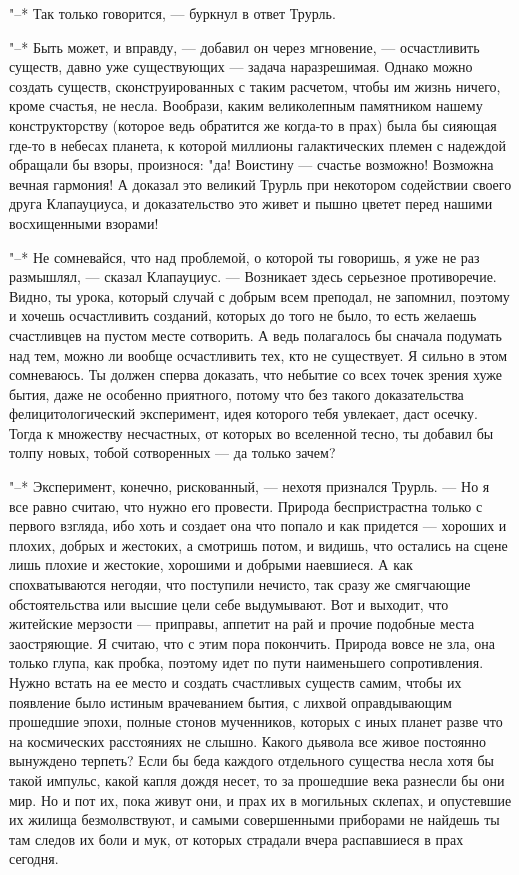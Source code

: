 "--* Так только говорится, --- буркнул в ответ Трурль.

"--* Быть может, и вправду, --- добавил он через мгновение, --- осчастливить
существ, давно уже существующих --- задача
наразрешимая. Однако можно создать существ,
сконструированных с таким расчетом, чтобы им жизнь ничего,
кроме счастья, не несла. Вообрази, каким великолепным
памятником нашему конструкторству (которое ведь обратится же
когда-то в прах) была бы сияющая где-то в небесах планета, к
которой миллионы галактических племен с надеждой обращали бы
взоры, произнося: "да! Воистину --- счастье возможно! Возможна
вечная гармония! А доказал это великий Трурль при некотором
содействии своего друга Клапауциуса, и доказательство это
живет и пышно цветет перед нашими восхищенными взорами!

"--* Не сомневайся, что над проблемой, о которой ты
говоришь, я уже не раз размышлял, --- сказал Клапауциус. --- Возникает
здесь серьезное противоречие. Видно, ты урока,
который случай с добрым всем преподал, не запомнил, поэтому
и хочешь осчастливить созданий, которых до того не было, то
есть желаешь счастливцев на пустом месте сотворить. А ведь
полагалось бы сначала подумать над тем, можно ли вообще
осчастливить тех, кто не существует. Я сильно в этом
сомневаюсь. Ты должен сперва доказать, что небытие со всех
точек зрения хуже бытия, даже не особенно приятного, потому
что без такого доказательства фелицитологический
эксперимент, идея которого тебя увлекает, даст осечку. Тогда
к множеству несчастных, от которых во вселенной тесно, ты
добавил бы толпу новых, тобой сотворенных --- да только зачем?

"--* Эксперимент, конечно, рискованный, --- нехотя признался
Трурль. --- Но  я все равно считаю, что  нужно его провести.
Природа беспристрастна только с  первого взгляда, ибо хоть и
создает  она  что  попало  и  как  придется  ---  хороших  и
плохих, добрых и  жестоких, а смотришь потом,  и видишь, что
остались на сцене лишь плохие и жестокие, хорошими и добрыми
наевшиеся.  А  как  спохватываются  негодяи,  что  поступили
нечисто, так  сразу же смягчающие обстоятельства  или высшие
цели себе выдумывают. Вот  и выходит, что житейские мерзости
---  приправы,  аппетит  на  рай  и  прочие  подобные  места
заостряющие. Я  считаю, что  с этим пора  покончить. Природа
вовсе не зла, она только  глупа, как пробка, поэтому идет по
пути наименьшего  сопротивления. Нужно встать на  ее место и
создать счастливых  существ самим,  чтобы их  появление было
истиным врачеванием бытия,  с лихвой оправдывающим прошедшие
эпохи, полные стонов мученников, которых с иных планет разве
что на космических расстояниях не слышно. Какого дьявола все
живое  постоянно вынуждено  терпеть?  Если  бы беда  каждого
отдельного существа несла хотя бы такой импульс, какой капля
дождя несет, то за прошедшие века  разнесли бы они мир. Но и
пот их,  пока живут они,  и прах  их в могильных  склепах, и
опустевшие  их жилища  безмолвствуют, и  самыми совершенными
приборами не найдешь ты там следов их боли и мук, от которых
страдали вчера распавшиеся в прах сегодня.

